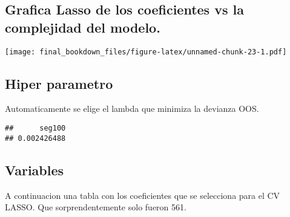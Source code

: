 \documentclass[
]{book}
\newenvironment{Shaded}{\begin{snugshade}}{\end{snugshade}}
\newcommand{\AttributeTok}[1]{\textcolor[rgb]{0.77,0.63,0.00}{#1}}
\newcommand{\CommentTok}[1]{\textcolor[rgb]{0.56,0.35,0.01}{\textit{#1}}}
\newcommand{\FunctionTok}[1]{\textcolor[rgb]{0.00,0.00,0.00}{#1}}
\newcommand{\NormalTok}[1]{#1}
\newcommand{\OtherTok}[1]{\textcolor[rgb]{0.56,0.35,0.01}{#1}}
\newcommand{\SpecialCharTok}[1]{\textcolor[rgb]{0.00,0.00,0.00}{#1}}
\newcommand{\StringTok}[1]{\textcolor[rgb]{0.31,0.60,0.02}{#1}}
\begin{document}
\hypertarget{grafica-lasso-de-los-coeficientes-vs-la-complejidad-del-modelo.}{%
\subsection{Grafica Lasso de los coeficientes vs la complejidad del modelo.}\label{grafica-lasso-de-los-coeficientes-vs-la-complejidad-del-modelo.}}

\begin{Shaded}
\end{Shaded}

\texttt{[image: final\_bookdown\_files/figure-latex/unnamed-chunk-23-1.pdf]}

\hypertarget{hiper-parametro}{%
\subsection{Hiper parametro}\label{hiper-parametro}}

Automaticamente se elige el lambda que minimiza la devianza OOS.

\begin{Shaded}
\end{Shaded}

\begin{verbatim}
##      seg100 
## 0.002426488
\end{verbatim}

\hypertarget{variables}{%
\subsection{Variables}\label{variables}}

A continuacion una tabla con los coeficientes que se selecciona para el CV LASSO. Que sorprendentemente solo fueron 561.
\end{document}
